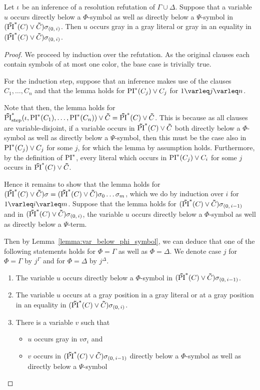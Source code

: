 \documentclass[%
	draft=false,%
	numbers=noendperiod,%
	11pt,%
	a4paper,%
	oneside,%
	openany,%
]{memoir}
\begin{document}
\begin{lemma}
	\label{lemma:col_change}
	Let $\iota$ be an inference of a resolution refutation of $\Gamma \cup \Delta$.
	Suppose that a variable $u$ occurs directly below a $\Phi$-symbol as well as directly below a $\Psi$-symbol in $(\bm\tilde{\operatorname{PI}}^{*}(C)\lor \bm\tilde{C})\sigma_{(0,\,i)}$.
	Then $u$ occurs gray in a gray literal or gray in an equality in $(\bm\tilde{\operatorname{PI}}^{*}(C)\lor \bm\tilde{C})\sigma_{(0,\,i)}$.
\end{lemma}
\begin{proof}
	We proceed by induction over the refutation.
	As the original clauses each contain symbols of at most one color, the base case is trivially true.

	For the induction step, suppose that an inference makes use of the clauses $C_1, \dots, C_n$ and that the lemma holds for $\operatorname{PI}^*(C_j) \lor C_j$ for $1\varleq j \varleq n$. 

	Note that then, the lemma holds for $\bm\tilde{\operatorname{PI}}^{*}_{\mathrm{step}}(\iota, \operatorname{PI}^*(C_1), \dots, \operatorname{PI}^*(C_n)) \lor \bm\tilde{C} = \bm\tilde{\operatorname{PI}}^{*}(C)\lor \bm\tilde{C}$.
	This is because as all clauses are variable-disjoint, 
	if a variable occurs in $\bm\tilde{\operatorname{PI}}^{*}(C)\lor \bm\tilde{C}$ both directly below a $\Phi$-symbol as well as directly below a $\Psi$-symbol, then this must be the case also in 
	$\operatorname{PI}^*(C_j) \lor C_j$ for some $j$, for which the lemma by assumption holds.
	Furthermore, by the definition of $\operatorname{PI}^*$, every literal which occurs in $\operatorname{PI}^*(C_j) \lor C_i$ for some $j$ occurs in $\bm\tilde{\operatorname{PI}}^{*}(C)\lor \bm\tilde{C}$.

	Hence it remains to show that the lemma holds for $(\bm\tilde{\operatorname{PI}}^{*}(C)\lor \bm\tilde{C})\sigma = (\bm\tilde{\operatorname{PI}}^{*}(C)\lor \bm\tilde{C})\sigma_0\dots\sigma_m$, which we do by induction over $i$ for $1\varleq i \varleq m$.
	Suppose that the lemma holds for $(\bm\tilde{\operatorname{PI}}^{*}(C)\lor \bm\tilde{C})\sigma_{(0,\,i-1)}$ and in $(\bm\tilde{\operatorname{PI}}^{*}(C)\lor \bm\tilde{C})\sigma_{(0,\,i)}$, the variable $u$ occurs directly below a $\Phi$-symbol as well as directly below a $\Psi$-term.

	Then by Lemma~\ref{lemma:var_below_phi_symbol}, we can deduce that one of the following statements holds for $\Phi = \Gamma$ as well as $\Phi = \Delta$. We denote case $j$ for $\Phi = \Gamma$ by $j^\Gamma$ and for $\Phi = \Delta$ by $j^\Delta$.

	\begin{enumerate}
		\item
			\label{16_1}
			The variable $u$ occurs directly below a $\Phi$-symbol in $(\bm\tilde{\operatorname{PI}}^{*}(C)\lor \bm\tilde{C})\sigma_{(0,\,i-1)}$.

		\item
			\label{16_4}
			The variable $u$ occurs at a gray position in a gray literal or at a gray position in an equality in $(\bm\tilde{\operatorname{PI}}^{*}(C)\lor \bm\tilde{C})\sigma_{(0,\,i)}$.

		\item 
			\label{16_2}
			There is a variable $v$ such that 
			{
				\renewcommand{\labelitemi}{\textendash}
				\begin{itemize}
					\item $u$ occurs gray in $v\sigma_i$ and
					\item $v$ occurs in $(\bm\tilde{\operatorname{PI}}^{*}(C)\lor \bm\tilde{C})\sigma_{(0,\,i-1)}$ directly below a $\Phi$-symbol as well as directly below a $\Psi$-symbol
				\end{itemize}
			}
	\end{enumerate}


\end{proof}
\end{document}
